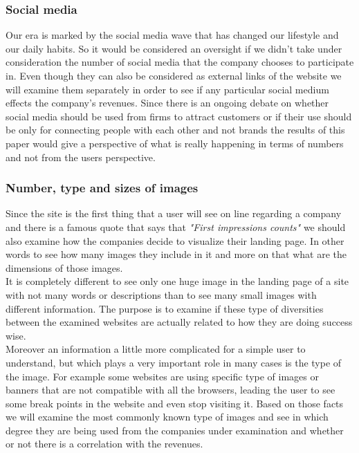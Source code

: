 \documentclass{article}
\begin{document}
\subsubsection{Social media}\label{M:Social media}
Our era is marked by the social media wave that has changed our lifestyle and our daily habits. So it would be considered an oversight if we didn't take under consideration the number of social media that the company chooses to participate in. Even though they can also be considered as external links of the website we will examine them separately in order to see if any particular social medium effects the company's revenues. Since there is an ongoing debate on whether social media should be used from firms to attract customers or if their use should be only for connecting people with each other and not brands the results of this paper would give a perspective of what is really happening in terms of numbers and not from the users perspective.
\subsubsection{Number, type and sizes of images}\label{M:N,T,S Imgs}
Since the site is the first thing that a user will see on line regarding a company and there is a famous quote that says that \textit{"First impressions counts"} we should also examine how the companies decide to visualize their landing page. In other words to see how many images they include in it and more on that what are the dimensions of those images.\\ 
It is completely different to see only one huge image in the landing page of a site with not many words or descriptions than to see many small images with different information. The purpose is to examine if these type of diversities between the examined websites are actually related to how they are doing success wise.\\
Moreover an information a little more complicated for a simple user to understand, but which  plays a very important role in many cases is the type of the image. For example some websites are using specific type of images or banners that are not compatible with all the browsers, leading the user to see some break points in the website and even stop visiting it. Based on those facts we will examine the most commonly known type of images and see in which degree they are being used from the companies under examination and whether or not there is a correlation with the revenues.
\end{document}

